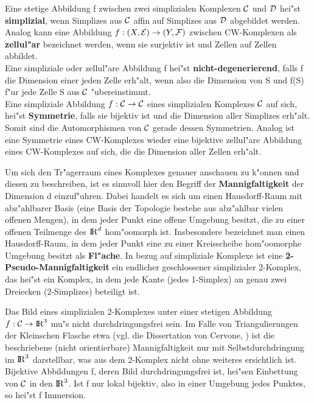 Eine stetige Abbildung f zwischen zwei simplizialen Komplexen $\cal C$
und ${\cal D}$ hei"st {\bf simplizial}, wenn
Simplizes aus $\cal C$ affin auf Simplizes aus ${\cal D}$ abgebildet werden.
Analog kann eine Abbildung $f:(X,{\cal E})\to (Y,{\cal F})$
zwischen CW-Komplexen als {\bf zellul"ar} bezeichnet
werden, wenn sie surjektiv ist und Zellen auf Zellen abbildet.\\
Eine simpliziale oder zellul"are Abbildung f hei"st {\bf nicht-degenerierend},
 falls f die Dimension einer jeden Zelle erh"alt,
wenn also die Dimension von S und f(S) f"ur jede Zelle S aus $\cal C$
"ubereinstimmt.\\
Eine simpliziale Abbildung $f:{\cal C} \to {\cal C}$ eines simplizialen
Komplexes $\cal C$ auf sich, hei"st {\bf Symmetrie},\label{symm} falls sie bijektiv ist und die Dimension aller Simplizes
erh"alt. Somit sind die Automorphismen von $\cal C$ gerade dessen Symmetrien.
Analog ist eine Symmetrie eines CW-Komplexes wieder eine bijektive zellul"are
Abbildung eines CW-Komplexes auf sich, die die Dimension aller Zellen erh"alt.

Um sich den Tr"agerraum eines Komplexes genauer anschauen zu k"onnen und
diesen zu beschreiben, ist es sinnvoll hier den Begriff der
{\bf Mannigfaltigkeit} der Dimension d einzuf"uhren.
Dabei handelt es sich um einen Hausdorff-Raum mit abz"ahlbarer Basis
(eine Basis der Topologie bestehe aus abz"ahlbar vielen offenen Mengen),
in dem jeder Punkt eine offene Umgebung besitzt, die zu einer offenen Teilmenge
des $\mbox{$\rm I\!R$}^d$ hom"oomorph ist. Insbesondere bezeichnet man einen Hausdorff-Raum,
in dem jeder Punkt eine zu einer Kreisscheibe hom"oomorphe Umgebung besitzt
als {\bf Fl"ache}. In bezug auf simpliziale Komplexe ist eine
{\bf 2-Pseudo-Mannigfaltigkeit} ein endlicher
geschlossener simplizialer 2-Komplex, das hei"st ein Komplex, in dem jede Kante
(jedes 1-Simplex) an genau zwei Dreiecken (2-Simplizes) beteiligt ist.

{\scsi
Das Bild eines simplizialen 2-Komplexes unter einer stetigen Abbildung
$f:{\cal C}\to \mbox{$\rm I\!R$}^3$ mu"s nicht durchdringungsfrei sein. Im Falle von
Triangulierungen der Kleinschen Flasche etwa (vgl. die Dissertation von Cervone,
\cite{Ce:93}) ist die beschriebene (nicht orientierbare) Mannigfaltigkeit nur
mit Selbstdurchdringung im $\mbox{$\rm I\!R$}^3$ darstellbar, was aus dem 2-Komplex
nicht ohne weiteres ersichtlich ist. Bijektive Abbildungen f, deren Bild
durchdringungsfrei ist, hei"sen Einbettung von $\cal C$ in den $\mbox{$\rm I\!R$}^3$.
Ist f nur lokal bijektiv, also in einer Umgebung jedes Punktes, so hei"st f
Immersion.
}

